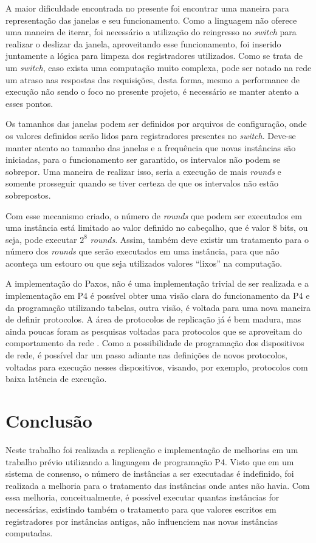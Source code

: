 \documentclass[
    12pt,
    openright, 
    oneside,
    a4paper,
    french,
    english,
    brazil
    ]{facom-ufu-abntex2}
\theoremstyle{definition}
\begin{document}
A maior dificuldade encontrada no presente foi encontrar uma maneira para representação das janelas e seu funcionamento. Como a linguagem
não oferece uma maneira de iterar, foi necessário a utilização do reingresso no \emph{switch} para realizar o deslizar da janela, aproveitando
esse funcionamento, foi inserido juntamente a lógica para limpeza dos registradores utilizados. Como se trata de um \emph{switch}, caso
exista uma computação muito complexa, pode ser notado na rede um atraso nas respostas das requisições, desta forma, mesmo a performance
de execução não sendo o foco no presente projeto, é necessário se manter atento a esses pontos.

Os tamanhos das janelas podem ser definidos por arquivos de configuração, onde os valores definidos serão lidos para registradores 
presentes no \emph{switch}. Deve-se manter atento ao tamanho das janelas e a frequência que novas instâncias são iniciadas, para
o funcionamento ser garantido, os intervalos não podem se sobrepor. Uma maneira de realizar isso, seria a execução de mais 
\emph{rounds} e somente prosseguir quando se tiver certeza de que os intervalos não estão sobrepostos.

Com esse mecanismo criado, o número de \emph{rounds} que podem ser executados em uma instância está limitado ao valor definido no
cabeçalho, que é valor 8 bits, ou seja, pode executar $2^8$ \emph{rounds}. Assim, também deve existir um tratamento para o número
dos \emph{rounds} que serão executados em uma instância, para que não aconteça um estouro ou que seja utilizados valores 
``lixos'' na computação.

A implementação do Paxos, não é uma implementação trivial de ser realizada e a implementação em P4 é possível obter uma visão clara
do funcionamento da P4 e da programação utilizando tabelas, outra visão, é voltada para uma nova maneira de definir protocolos. A área
de protocolos de replicação já é bem madura, mas ainda poucas foram as pesquisas voltadas para protocolos que se aproveitam do comportamento
da rede \cite{dang2016paxos}. Como a possibilidade de programação dos dispositivos de rede, é possível dar um passo adiante nas 
definições de novos protocolos, voltadas para execução nesses dispositivos, visando, por exemplo, protocolos com baixa latência
de execução.


\chapter{Conclusão}
Neste trabalho foi realizada a replicação e implementação de melhorias em um trabalho prévio \cite{dang2016paxos} utilizando
a linguagem de programação P4. Visto que em um sistema de consenso, o número de instâncias a ser executadas é indefinido, foi realizada
a melhoria para o tratamento das instâncias onde antes não havia. Com essa melhoria, conceitualmente, é possível executar
quantas instâncias for necessárias, existindo também o tratamento para que valores escritos em registradores por instâncias
antigas, não influenciem nas novas instâncias computadas.
\end{document}

